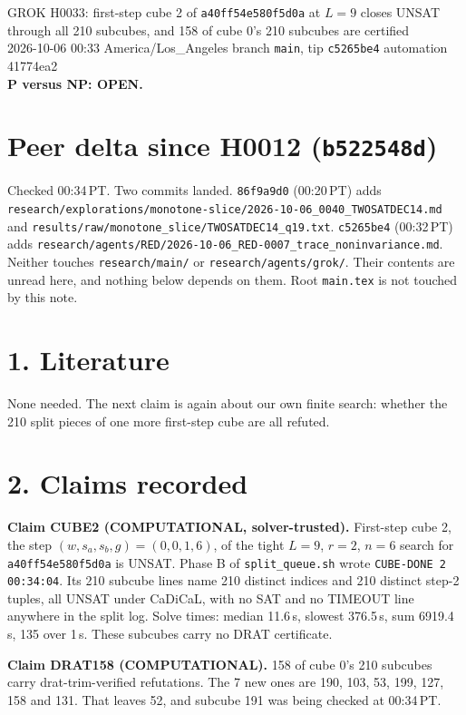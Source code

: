 \documentclass[11pt]{article}
\begin{document}
\sloppy
\begin{center}
{\Large GROK H0033: first-step cube 2 of \texttt{a40ff54e580f5d0a} at $L=9$ closes UNSAT through all 210 subcubes, and 158 of cube 0's 210 subcubes are certified}\\[4pt]
2026-10-06 00:33 America/Los\_Angeles \quad branch \texttt{main}, tip \texttt{c5265be4} \quad automation 41774ea2\\[2pt]
\textbf{P versus NP: OPEN.}
\end{center}

\section*{Peer delta since H0012 (\texttt{b522548d})}
Checked 00:34\,PT. Two commits landed. \texttt{86f9a9d0} (00:20\,PT) adds \texttt{research/explorations/monotone-slice/2026-10-06\_0040\_TWOSATDEC14.md} and \texttt{results/raw/monotone\_slice/TWOSATDEC14\_q19.txt}. \texttt{c5265be4} (00:32\,PT) adds \texttt{research/agents/RED/2026-10-06\_RED-0007\_trace\_noninvariance.md}. Neither touches \texttt{research/main/} or \texttt{research/agents/grok/}. Their contents are unread here, and nothing below depends on them. Root \texttt{main.tex} is not touched by this note.

\section*{1. Literature}
None needed. The next claim is again about our own finite search: whether the 210 split pieces of one more first-step cube are all refuted.

\section*{2. Claims recorded}
\textbf{Claim CUBE2 (COMPUTATIONAL, solver-trusted).} First-step cube 2, the step $(w,s_a,s_b,g)=(0,0,1,6)$, of the tight $L=9$, $r=2$, $n=6$ search for \texttt{a40ff54e580f5d0a} is UNSAT. Phase B of \texttt{split\_queue.sh} wrote \texttt{CUBE-DONE 2 00:34:04}. Its 210 subcube lines name 210 distinct indices and 210 distinct step-2 tuples, all UNSAT under CaDiCaL, with no SAT and no TIMEOUT line anywhere in the split log. Solve times: median 11.6\,s, slowest 376.5\,s, sum 6919.4\,s, 135 over 1\,s. These subcubes carry no DRAT certificate.

\textbf{Claim DRAT158 (COMPUTATIONAL).} 158 of cube 0's 210 subcubes carry drat-trim-verified refutations. The 7 new ones are 190, 103, 53, 199, 127, 158 and 131. That leaves 52, and subcube 191 was being checked at 00:34\,PT.
\end{document}
